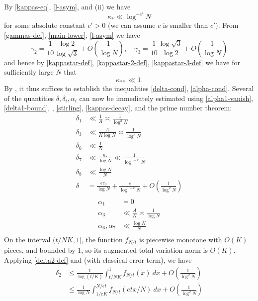 \documentclass[12pt,a4paper,reqno]{amsart}
\numberwithin{equation}{section}
\theoremstyle{plain}
\theoremstyle{definition}
\begin{document}
By \eqref{kappas-eq}, \eqref{l-asym}, and (ii) we have
\begin{equation}\label{kappas-decay} 
  \kappa_* \ll \log^{-c'} N
\end{equation}
for some absolute constant $c'>0$ (we can assume $c$ is smaller than $c'$).  From \eqref{gammas-def}, \eqref{main-lower}, \eqref{l-asym} we have
$$ \gamma_2 = \frac{1}{10} \frac{\log 2}{\log \sqrt{3}} + O\left(\frac{1}{\log N}\right), \quad
 \gamma_3 = \frac{1}{10} \frac{\log \sqrt{3}}{\log 2} + O\left(\frac{1}{\log N}\right)
$$
and hence by \eqref{kappastar-def},  \eqref{kappastar-2-def}, \eqref{kappastar-3-def} we have for sufficiently large $N$ that
$$ \kappa_{**} \ll 1.$$
By , it thus suffices to establish the inequalities \eqref{delta-cond}, \eqref{alpha-cond}.
Several of the quantities $\delta, \delta_i, \alpha_i$ can now be immediately estimated using \eqref{alpha1-vanish}, \eqref{delta1-bound}, , \eqref{stirling}, \eqref{kappas-decay}, and the prime number theorem:
\begin{align*}
  \delta_1 &\ll \frac{1}{A} \asymp \frac{1}{\log^2 N} \\
  \delta_3 &\ll \frac{A}{K \log N} \asymp \frac{1}{\log^2 N} \\
  \delta_6 &\ll \frac{1}{N} \\
  \delta_7 &\ll \frac{\kappa_*}{\log N} \ll \frac{1}{\log^{1+c'} N} \\
  \delta_8 &\ll \frac{\log N}{N} \\
  \delta &= \frac{ec_0}{\log N} + \frac{e}{\log^{1+c} N} + O\left( \frac{1}{\log^2 N} \right)\\  
\end{align*}
\begin{align*}
  \alpha_1 &= 0 \\
  \alpha_3 &\ll \frac{A}{K} \asymp \frac{1}{\log N} \\
  \alpha_6, \alpha_7 &\ll \frac{\log N}{N} \\
\end{align*}
On the interval $(t/NK,1]$, the function $f_{N/t}$ is piecewise monotone with $O(K)$ pieces, and bounded by $1$, so its augmented total variation norm is $O(K)$.  Applying \eqref{delta2-def} and  (with classical error term), we have
\begin{align*}
\delta_2 &\leq \frac{1}{\log(t/K)} \int_{t/NK}^1 f_{N/t}(x)\ dx + O\left( \frac{1}{\log^2 N} \right) \\
&\leq \frac{1}{\log N} \int_{1/eK}^{N/et} f_{N/t}(etx/N)\ dx + O\left( \frac{1}{\log^2 N} \right)
\end{align*}
\end{document}
